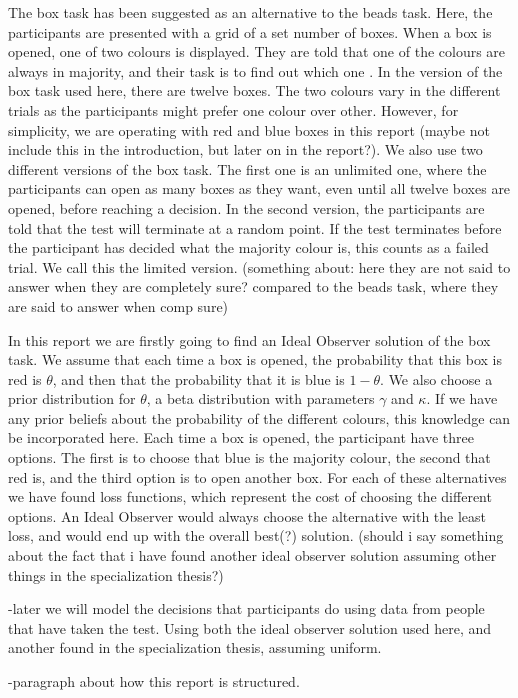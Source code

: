 The box task has been suggested as an alternative to the beads task. Here, the participants are presented with a grid of a set number of boxes. When a box is opened, one of two colours is displayed. They are told that one of the colours are always in majority, and their task is to find out which one \citep{moritz2017}. In the version of the box task used here, there are twelve boxes. The two colours vary in the different trials as the participants might prefer one colour over other. However, for simplicity, we are operating with red and blue boxes in this report (maybe not include this in the introduction, but later on in the report?). We also use two different versions of the box task. The first one is an unlimited one, where the participants can open as many boxes as they want, even until all twelve boxes are opened, before reaching a decision. In the second version, the participants are told that the test will terminate at a random point. If the test terminates before the participant has decided what the majority colour is, this counts as a failed trial. We call this the limited version. (something about: here they are not said to answer when they are completely sure? compared to the beads task, where they are said to answer when comp sure)

In this report we are firstly going to find an Ideal Observer solution of the box task. We assume that each time a box is opened, the probability that this box is red is $\theta$, and then that the probability that it is blue is $1-\theta$. We also choose a prior distribution for $\theta$, a beta distribution with parameters $\gamma$ and $\kappa$. If we have any prior beliefs about the probability of the different colours, this knowledge can be incorporated here. Each time a box is opened, the participant have three options. The first is to choose that blue is the majority colour, the second that red is, and the third option is to open another box. For each of these alternatives we have found loss functions, which represent the cost of choosing the different options. An Ideal Observer would always choose the alternative with the least loss, and would end up with the overall best(?) solution. (should i say something about the fact that i have found another ideal observer solution assuming other things in the specialization thesis?)




-later we will model the decisions that participants do using data from people that have taken the test. Using both the ideal observer solution used here, and another found in the specialization thesis, assuming uniform. 

-paragraph about how this report is structured. 